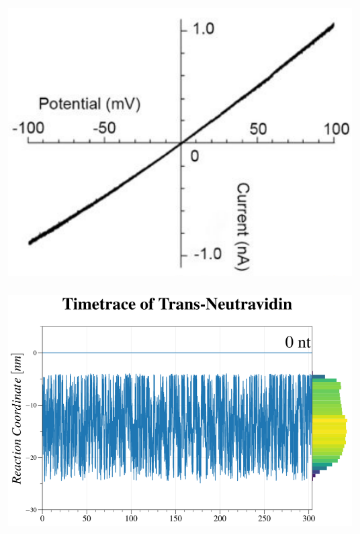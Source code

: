 \begin{figure}[ht!]

  \begin{centering}
  \begin{subfigure}[t]{\dimexpr.29\linewidth-1.3em\relax}
  \centering
  \vspace{0.35cm}
  \includegraphics[width=1.05\linewidth,valign=t]{Figures/IV-100.png}
  \end{subfigure}%
  \begin{subfigure}[t]{\dimexpr.5\linewidth-1.3em\relax}
  \centering
  \hspace{-0.2cm}
  \vspace{0.1cm}
  \includegraphics[width=0.95\linewidth,valign=t]{Figures/MR-100.png}

\end{subfigure}
\end{centering}
\end{figure}
